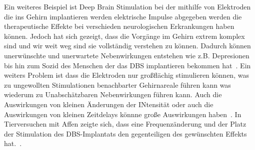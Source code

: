 \documentclass[a4paper,
DIV=13,
12pt,
BCOR=10mm,
department=FakEI,
twoside,
parskip=half,
automark,
]{OTHRartcl}
\begin{document}
Ein  weiteres Beispiel ist Deep Brain Stimulation bei der mithilfe von Elektroden die ins Gehirn implantieren werden elektrische Impulse abgegeben werden die therapeutische Effekte bei 
verschieden neurologischen Erkrankungen haben können. Jedoch hat sich gezeigt, dass die Vorgänge im Gehirn extrem komplex sind und wir weit weg sind sie vollständig verstehen zu können. 
Dadurch können unerwünschte und unerwartete Nebenwirkungen entstehen wie z.B. Depresionen bis hin zum Sozid des Menschen der das DBS implantieren bekommen hat~\cite{zarzycki2020stimulation}.  
Ein weiters Problem ist dass die Elektroden nur großflächig stimulieren können, was zu ungewollten Stimulationen benachbarter Gehirnareale führen kann was wiederum zu Unabschätzbaren Nebenwirkungen
führen kann. Auch die Auswirkungen von kleinen Änderungen der INtensität oder auch die Auswirkungen von kleinen Zeitdelays könnne große Auswirkungen haben~\cite{al2021impact}. In 
Tierversuchen mit Affen zeigte sich, dass eine Frequenzänderung und der Platz der Stimulation des DBS-Implantats den gegenteiligen des gewünschten Effekts hat.~\cite{logothetis2010effects}.
\end{document}
